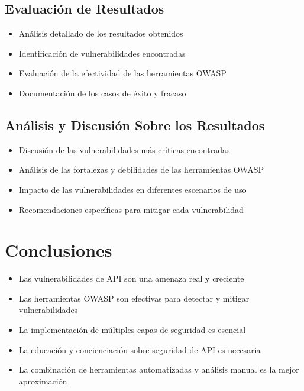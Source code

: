 \documentclass[a4paper,12pt]{article}
\begin{document}
\subsection{Evaluación de Resultados}

\begin{itemize}
    \item Análisis detallado de los resultados obtenidos
    \item Identificación de vulnerabilidades encontradas
    \item Evaluación de la efectividad de las herramientas OWASP
    \item Documentación de los casos de éxito y fracaso
\end{itemize}

\subsection{Análisis y Discusión Sobre los Resultados}

\begin{itemize}
    \item Discusión de las vulnerabilidades más críticas encontradas
    \item Análisis de las fortalezas y debilidades de las herramientas OWASP
    \item Impacto de las vulnerabilidades en diferentes escenarios de uso
    \item Recomendaciones específicas para mitigar cada vulnerabilidad
\end{itemize}

\section{Conclusiones}

\begin{itemize}
    \item Las vulnerabilidades de API son una amenaza real y creciente
    \item Las herramientas OWASP son efectivas para detectar y mitigar vulnerabilidades
    \item La implementación de múltiples capas de seguridad es esencial
    \item La educación y concienciación sobre seguridad de API es necesaria
    \item La combinación de herramientas automatizadas y análisis manual es la mejor aproximación
\end{itemize}
\end{document}
